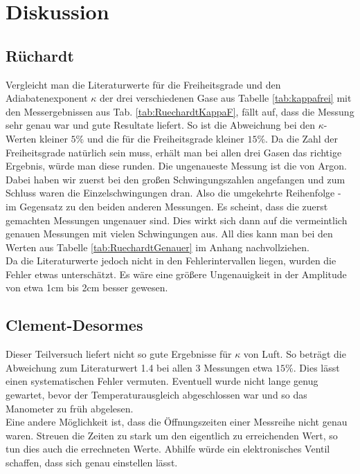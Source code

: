 \documentclass[12pt,a4paper,titlepage,headinclude,bibtotoc]{scrartcl}
\begin{document}
\section{Diskussion}
\label{sec:diskussion}

\subsection{Rüchardt}
Vergleicht man die Literaturwerte für die Freiheitsgrade und den Adiabatenexponent $\kappa$ der drei verschiedenen Gase aus Tabelle \ref{tab:kappafrei} mit den Messergebnissen aus Tab. \ref{tab:RuechardtKappaF}, fällt auf, dass die Messung sehr genau war und gute Resultate liefert.
So ist die Abweichung bei den $\kappa$-Werten kleiner $5\%$ und die für die Freiheitsgrade kleiner $15\%$.
Da die Zahl der Freiheitsgrade natürlich sein muss, erhält man bei allen drei Gasen das richtige Ergebnis, würde man diese runden.
Die ungenaueste Messung ist die von Argon.
Dabei haben wir zuerst bei den großen Schwingungszahlen angefangen und zum Schluss waren die Einzelschwingungen dran.
Also die umgekehrte Reihenfolge - im Gegensatz zu den beiden anderen Messungen.
Es scheint, dass die zuerst gemachten Messungen ungenauer sind.
Dies wirkt sich dann auf die vermeintlich genauen Messungen mit vielen Schwingungen aus.
All dies kann man bei den Werten aus Tabelle \ref{tab:RuechardtGenauer} im Anhang nachvollziehen.\\
Da die Literaturwerte  jedoch nicht in den Fehlerintervallen liegen, wurden die Fehler etwas unterschätzt.
Es wäre eine größere Ungenauigkeit in der Amplitude von etwa 1cm bis 2cm besser gewesen.

\subsection{Clement-Desormes}
Dieser Teilversuch liefert nicht so gute Ergebnisse für $\kappa$ von Luft.
So beträgt die Abweichung zum Literaturwert 1.4 bei allen 3 Messungen etwa $15\%$.
Dies lässt einen systematischen Fehler vermuten.
Eventuell wurde nicht lange genug gewartet, bevor der Temperaturausgleich abgeschlossen war und so das Manometer zu früh abgelesen.\\
Eine andere Möglichkeit ist, dass die Öffnungszeiten einer Messreihe nicht genau waren.
Streuen die Zeiten zu stark um den eigentlich zu erreichenden Wert, so tun dies auch die errechneten Werte.
Abhilfe würde ein elektronisches Ventil schaffen, dass sich genau einstellen lässt.
\end{document}
